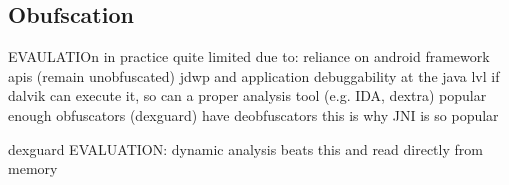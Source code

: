 \subsection{Obufscation}
\label{subsection:evaluation-reengineering-optobf}

EVAULATIOn
in practice quite limited due to:
reliance on android framework apis (remain unobfuscated)
jdwp and application debuggability at the java lvl
if dalvik can execute it, so can a proper analysis tool (e.g. IDA, dextra)
popular enough obfuscators (dexguard) have deobfuscators
this is why JNI is so popular

dexguard EVALUATION:  dynamic analysis beats this and read directly from memory

